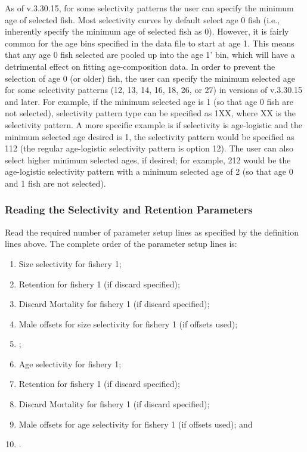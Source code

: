 As of v.3.30.15, for some selectivity patterns the user can specify the minimum age of selected fish. Most selectivity curves by default select age 0 fish (i.e., inherently specify the minimum age of selected fish as 0). However, it is fairly common for the age bins specified in the data file to start at age 1. This means that any age 0 fish selected are pooled up into the age 1' bin, which will have a detrimental effect on fitting age-composition data. In order to prevent the selection of age 0 (or older) fish, the user can specify the minimum selected age for some selectivity patterns (12, 13, 14, 16, 18, 26, or 27) in versions of v.3.30.15 and later. For example, if the minimum selected age is 1 (so that age 0 fish are not selected), selectivity pattern type can be specified as 1XX, where XX is the selectivity pattern. A more specific example is if selectivity is age-logistic and the minimum selected age desired is 1, the selectivity pattern would be specified as 112 (the regular age-logistic selectivity pattern is option 12). The user can also select higher minimum selected ages, if desired; for example, 212 would be the age-logistic selectivity pattern with a minimum selected age of 2 (so that age 0 and 1 fish are not selected).

\subsubsection{Reading the Selectivity and Retention Parameters}
Read the required number of parameter setup lines as specified by the definition lines above. The complete order of the parameter setup lines is:
\begin{enumerate}
	\item Size selectivity for fishery 1;
	\item Retention for fishery 1 (if discard specified);
	\item Discard Mortality for fishery 1 (if discard specified);
	\item Male offsets for size selectivity for fishery 1 (if offsets used);
	\item <repeat for additional fleets and surveys>;
	\item Age selectivity for fishery 1;
	\item Retention for fishery 1 (if discard specified);
	\item Discard Mortality for fishery 1 (if discard specified);
	\item Male offsets for age selectivity for fishery 1 (if offsets used); and
	\item <repeat for additional fleets and surveys>.
\end{enumerate}


